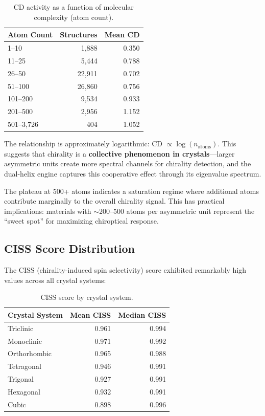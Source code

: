 \documentclass[11pt,a4paper]{article}
\begin{document}
\begin{table}[H]
\centering
\caption{CD activity as a function of molecular complexity (atom count).}
\label{tab:cd_atoms}
\begin{tabular}{lrr}
\toprule
Atom Count & Structures & Mean CD \\
\midrule
1--10 & 1,888 & 0.350 \\
11--25 & 5,444 & 0.788 \\
26--50 & 22,911 & 0.702 \\
51--100 & 26,860 & 0.756 \\
101--200 & 9,534 & 0.933 \\
201--500 & 2,956 & 1.152 \\
501--3,726 & 404 & 1.052 \\
\bottomrule
\end{tabular}
\end{table}

\noindent The relationship is approximately logarithmic: CD $\propto \log(n_{\text{atoms}})$. This suggests that chirality is a \textbf{collective phenomenon in crystals}---larger asymmetric units create more spectral channels for chirality detection, and the dual-helix engine captures this cooperative effect through its eigenvalue spectrum.

The plateau at 500+ atoms indicates a saturation regime where additional atoms contribute marginally to the overall chirality signal. This has practical implications: materials with $\sim$200--500 atoms per asymmetric unit represent the ``sweet spot'' for maximizing chiroptical response.

\subsection{CISS Score Distribution}

The CISS (chirality-induced spin selectivity) score exhibited remarkably high values across all crystal systems:

\begin{table}[H]
\centering
\caption{CISS score by crystal system.}
\label{tab:ciss}
\begin{tabular}{lrr}
\toprule
Crystal System & Mean CISS & Median CISS \\
\midrule
Triclinic & 0.961 & 0.994 \\
Monoclinic & 0.971 & 0.992 \\
Orthorhombic & 0.965 & 0.988 \\
Tetragonal & 0.946 & 0.991 \\
Trigonal & 0.927 & 0.991 \\
Hexagonal & 0.932 & 0.991 \\
Cubic & 0.898 & 0.996 \\
\bottomrule
\end{tabular}
\end{table}
\end{document}
